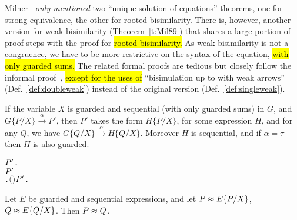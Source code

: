 Milner~\cite{Mil89} \emph{only mentioned} two ``unique solution of
equations'' theorems, one for strong equivalence, the other for
rooted bisimilarity.   There is, however, another
version for weak bisimilarity (Theorem~\ref{t:Mil89}) that shares a large portion of proof
steps with the proof for \hl{rooted bisimilarity.}
As weak bisimilarity is not a congruence, we have to be more restrictive
on the syntax of the equation, \hl{with only guarded sums.}
The related formal proofs are tedious but closely follow the informal
proof~\citep[p.~158--159]{Mil89}, \hl{except for the uses of} ``bisimulation up
to with weak arrows'' (Def.~\ref{def:doubleweak}) instead of the
original version (Def.~\ref{def:singleweak}).

\begin{lemma}
If the variable $X$ is guarded and sequential (with only guarded sums) in $G$, and
$G\{P/X\}\overset{\alpha}{\rightarrow} P'$, then $P'$ takes the form
$H\{P/X\}$, for some expression $H$, and for any $Q$, we have
$G\{Q/X\}\overset{\alpha}{\rightarrow} H\{Q/X\}$. Moreover $H$ is
sequential, and if $\alpha = \tau$ then $H$ is also guarded.
\begin{alltt}
\HOLTokenTurnstile{}   \HOLSymConst{\HOLTokenConj{}}   \HOLSymConst{\HOLTokenImp{}}
   \HOLSymConst{\HOLTokenForall{}}  \ensuremath{\HOLBoundVar{P}\sp{\prime}}.
         \HOLTokenTransBegin{}\HOLTokenTransEnd \ensuremath{\HOLBoundVar{P}\sp{\prime}} \HOLSymConst{\HOLTokenImp{}}
       \HOLSymConst{\HOLTokenExists{}}.   \HOLSymConst{\HOLTokenConj{}} \ensuremath{(} \HOLSymConst{\ensuremath{=}} \HOLSymConst{\ensuremath{\tau}} \HOLSymConst{\HOLTokenImp{}}  \ensuremath{)} \HOLSymConst{\HOLTokenConj{}} \ensuremath{\HOLBoundVar{P}\sp{\prime}} \HOLSymConst{\ensuremath{=}}   \HOLSymConst{\HOLTokenConj{}} \HOLSymConst{\HOLTokenForall{}}.   \HOLTokenTransBegin{}\HOLTokenTransEnd {} 
\end{alltt}
\end{lemma}

\begin{theorem}
  \label{thm:Mil89f}
Let $E$ be guarded and sequential expressions, and let $P \approx
E\{P/X\}$,
$Q \approx E\{Q/X\}$. Then $P \approx Q$.
\begin{alltt}
\HOLTokenTurnstile{}   \HOLSymConst{\HOLTokenConj{}}   \HOLSymConst{\HOLTokenConj{}}  \HOLSymConst{\HOLTokenWeakEQ}   \HOLSymConst{\HOLTokenConj{}}  \HOLSymConst{\HOLTokenWeakEQ}   \HOLSymConst{\HOLTokenImp{}}  \HOLSymConst{\HOLTokenWeakEQ} 
\end{alltt}
\end{theorem}

